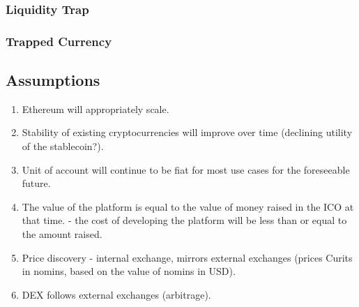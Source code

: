 \subsubsection{Liquidity Trap}
\subsubsection{Trapped Currency}

\subsection{Assumptions}

\begin{enumerate}
	\item Ethereum will appropriately scale.
	\item Stability of existing cryptocurrencies will improve over time (declining utility of the stablecoin?).
	\item Unit of account will continue to be fiat for most use cases for the foreseeable future.
	\item The value of the platform is equal to the value of money raised in the ICO at that time.
   - the cost of developing the platform will be less than or equal to the amount raised.
	\item Price discovery - internal exchange, mirrors external exchanges (prices Curits in nomins, based on the value of nomins in USD).
	\item DEX follows external exchanges (arbitrage).
\end{enumerate}

\pagebreak